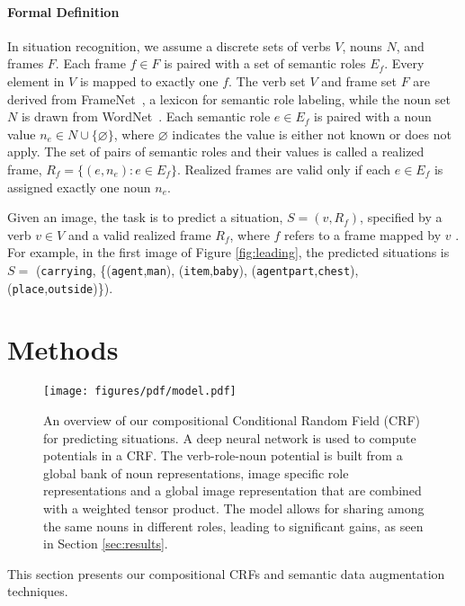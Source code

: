 \documentclass[10pt,twocolumn,letterpaper]{article}
\begin{document}
\paragraph{Formal Definition}
In situation recognition, we assume a discrete sets of verbs $V$, nouns $N$, and frames $F$.
Each frame $f \in F$ is paired with a set of semantic roles $E_f$.
Every element in $V$ is mapped to exactly one $f$. 
The verb set $V$ and frame set $F$ are derived from FrameNet~\cite{framenet}, a lexicon for semantic role labeling, while the noun set $N$ is drawn from WordNet~\cite{wordnet}.
Each semantic role $e \in E_f$ is paired with a noun value $n_e \in N \cup \{\varnothing\}$, where $\varnothing$ indicates the value is either not known or does not apply.
The set of pairs of semantic roles and their values is called a realized frame, $R_f = \{(e, n_e) : e \in E_f\}$. 
Realized frames are valid only if each $e \in E_f$ is assigned exactly one noun $n_e$.

Given an image, the task is to predict a situation, $S = (v, R_f)$, specified by a verb $v \in V$ and a valid realized frame $R_f$, where $f$ refers to a frame mapped by $v$ . For example, in the first image of Figure \ref{fig:leading}, the predicted situations is 
{\small $S=$ (\texttt{carrying}, \{(\texttt{agent},\texttt{man}), (\texttt{item},\texttt{baby}), (\texttt{agentpart},\texttt{chest}), (\texttt{place},\texttt{outside})\})}.

%
 \section{Methods}
\label{sec:model}
\begin{figure*}[t]
\centering
\texttt{[image: figures/pdf/model.pdf]}
\vspace{-.75in}
\caption{\small An overview of our compositional Conditional Random Field (CRF) for predicting situations. 
A deep neural network is used to compute potentials in a CRF.
The verb-role-noun potential is built from 
a global bank of noun representations, image specific role representations and a global image representation that are combined with a weighted tensor product. 
The model allows for sharing among the same nouns in different roles, leading to significant gains, as seen in Section \ref{sec:results}. }
\label{fig:model}
\end{figure*}

This section presents our compositional CRFs and semantic data augmentation techniques.
\end{document}
